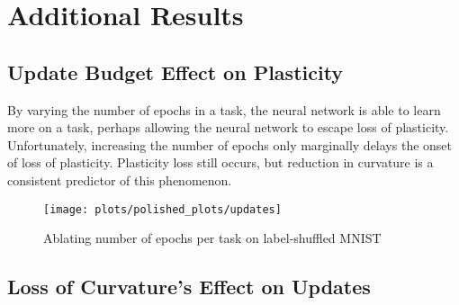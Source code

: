 


\section{Additional Results}

\subsection{Update Budget Effect on Plasticity }
By varying the number of epochs in a task, the neural network is able to learn more on a task, perhaps allowing the neural network to escape loss of plasticity.
Unfortunately, increasing the number of epochs only marginally delays the onset of loss of plasticity.
Plasticity loss still occurs, but reduction in curvature is a consistent predictor of this phenomenon.
\label{appendix:epochs}

\begin{figure}[h!]
  \centering
  \texttt{[image: plots/polished\_plots/updates]}
    \caption{Ablating number of epochs per task on label-shuffled MNIST}
  \label{fig:shuffle_reg_ablation}
\end{figure}

\subsection{Loss of Curvature's Effect on Updates}
\label{appendix:curvature_update}

